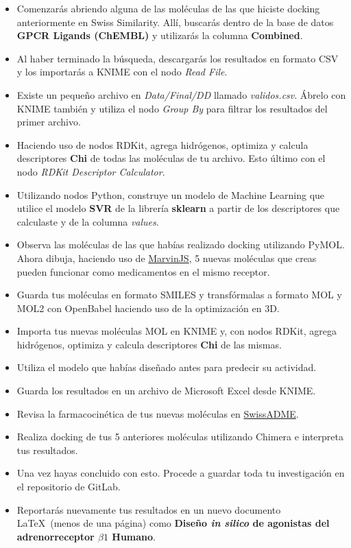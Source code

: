 \documentclass[10pt,letterpaper]{article}
\begin{document}
\begin{itemize}
\item Comenzar\'as abriendo alguna de las mol\'eculas de las que hiciste docking anteriormente en Swiss Similarity. All\'i, buscar\'as dentro de la base de datos \textbf{GPCR Ligands (ChEMBL)} y utilizar\'as la columna \textbf{Combined}.
\item Al haber terminado la b\'usqueda, descargar\'as los resultados en formato CSV y los importar\'as a KNIME con el nodo \textit{Read File}.
\item Existe un peque\~no archivo en \textit{Data/Final/DD} llamado \textit{validos.csv}. \'Abrelo con KNIME tambi\'en y utiliza el nodo \textit{Group By} para filtrar los resultados del primer archivo.
\item Haciendo uso de nodos RDKit, agrega hidr\'ogenos, optimiza y calcula descriptores \textbf{Chi} de todas las mol\'eculas de tu archivo. Esto \'ultimo con el nodo \textit{RDKit Descriptor Calculator}.
\item Utilizando nodos Python, construye un modelo de Machine Learning que utilice el modelo \textbf{SVR} de la librer\'ia \textbf{sklearn} a partir de los descriptores que calculaste y de la columna \textit{values}.
\item Observa las mol\'eculas de las que hab\'ias realizado docking utilizando PyMOL. Ahora dibuja, haciendo uso de \href{https://marvinjs-demo.chemaxon.com/latest/demo.html}{MarvinJS}, 5 nuevas mol\'eculas que creas pueden funcionar como medicamentos en el mismo receptor.
\item Guarda tus mol\'eculas en formato SMILES y transf\'ormalas a formato MOL y MOL2 con OpenBabel haciendo uso de la optimizaci\'on en 3D.
\item Importa tus nuevas mol\'eculas MOL en KNIME y, con nodos RDKit, agrega hidr\'ogenos, optimiza y calcula descriptores \textbf{Chi} de las mismas.
\item Utiliza el modelo que hab\'ias dise\~nado antes para predecir su actividad.
\item Guarda los resultados en un archivo de Microsoft Excel desde KNIME.
\item Revisa la farmacocin\'etica de tus nuevas mol\'eculas en \href{http://www.swissadme.ch/}{SwissADME}.
\item Realiza docking de tus 5 anteriores mol\'eculas utilizando Chimera e interpreta tus resultados.
\item Una vez hayas concluido con esto. Procede a guardar toda tu investigaci\'on en el repositorio de GitLab.
\item Reportar\'as nuevamente tus resultados en un nuevo documento \LaTeX\ (menos de una p\'agina) como \textbf{Dise\~no \emph{in silico} de agonistas del adrenorreceptor $\beta 1$ Humano}.
\end{itemize}
\end{document}
